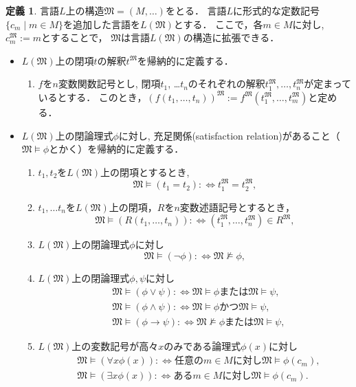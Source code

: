 \documentclass[uplatex, dvipdfmx]{jsarticle}
\newcommand{\M}{\mathfrak{M}}
\newcommand{\defiff}{ :\Leftrightarrow}
\theoremstyle{definition}
\newtheorem{definition}{定義}[section]
\begin{document}
\begin{definition}
     言語$L$上の構造$\M = (M,\dots)$をとる．
     言語$L$に形式的な定数記号$\{c_m \mid m \in M\}$を追加した言語を$L(\M)$とする．
     ここで，各$m \in M$に対し, $c_m^{\M}:=m$とすることで，
     $\M$は言語$L(\M)$の構造に拡張できる．
     \begin{itemize}
          \item $L(\M)$上の閉項$t$の解釈$t^\M$を帰納的に定義する．
          \begin{enumerate}
               \item $f$を$n$変数関数記号とし, 閉項$t_1$, \dots $t_n$のそれぞれの解釈$t_1^\M,\dots,t_n^\M$が定まっているとする．
               このとき，$(f(t_1,\dots,t_n))^\M:=f^\M(t_1^\M,\dots,t_m^\M)$と定める．
          \end{enumerate}
          \item $L(\M)$上の閉論理式$\phi$に対し, 充足関係(satisfaction relation)があること（$\M \models \phi$とかく）を帰納的に定義する．
          \begin{enumerate}
               \item $t_1,t_2$を$L(\M)$上の閉項とするとき, 
               \[
                    \M \models (t_1 = t_2) \defiff t_1^\M = t_2^\M,
               \]
               \item $t_1,\dots t_n$を$L(\M)$上の閉項，$R$を$n$変数述語記号とするとき，
               \[
                    \M \models (R(t_1, \dots, t_n)) \defiff (t_1^\M, \dots, t_n^\M) \in R^\M,
               \]
               \item $L(\M)$上の閉論理式$\phi$に対し
               \[
                    \M \models (\lnot \phi) \defiff \M \not\models \phi,
               \]
               \item $L(\M)$上の閉論理式$\phi, \psi$に対し
               \begin{align*}
                    &\M \models (\phi \lor \psi) \defiff \M \models \phi \text{または} \M \models \psi,\\
                    &\M \models (\phi \land \psi) \defiff \M \models \phi \text{かつ} \M \models \psi,\\
                    &\M \models (\phi \rightarrow \psi) \defiff \M \not\models \phi \text{または} \M \models \psi,
               \end{align*}
               \item $L(\M)$上の変数記号が高々$x$のみである論理式$\phi(x)$に対し
               \begin{align*}
                    &\M \models (\forall x \phi(x)) \defiff \text{任意の$m \in M$に対し}\M \models \phi(c_m),\\
                    &\M \models (\exists x \phi(x)) \defiff \text{ある$m \in M$に対し}\M \models\phi(c_m).
               \end{align*}
          \end{enumerate}
     \end{itemize}
\end{definition}
\end{document}
